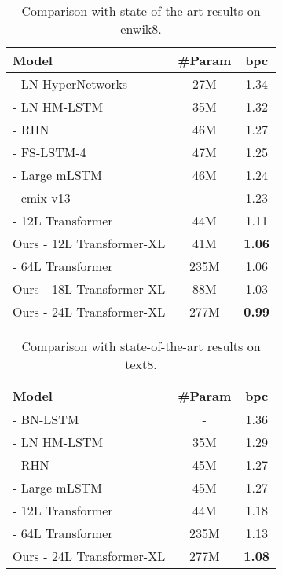 \documentclass[11pt,a4paper]{article}
\begin{document}
\bgroup
\setlength{\tabcolsep}{3pt}
\begin{table}[t]
    \small
    \centering
    \begin{tabular}{l|cc}
        \toprule
        \bf Model & \bf \#Param & \bf bpc \\
        \midrule
        \citet{ha2016hypernetworks} - LN HyperNetworks & 27M & 1.34 \\
        \citet{chung2016hierarchical} - LN HM-LSTM & 35M & 1.32 \\
        \citet{zilly2016recurrent} - RHN & 46M & 1.27 \\
        \citet{mujika2017fast} - FS-LSTM-4 & 47M & 1.25 \\
        \citet{krause2016multiplicative} - Large mLSTM & 46M & 1.24 \\
        \citet{cmix} - cmix v13 & - & 1.23 \\
        \citet{al2018character} - 12L Transformer & 44M & 1.11 \\
Ours - 12L Transformer-XL & 41M & \textbf{1.06} \\
        \midrule
        \citet{al2018character} - 64L Transformer & 235M & 1.06 \\
        Ours - 18L Transformer-XL & 88M & 1.03 \\
        Ours - 24L Transformer-XL & 277M & \textbf{0.99} \\
        \bottomrule
    \end{tabular}
    \caption{\small
        Comparison with state-of-the-art results on enwik8.
    }
    \label{table:enwik8}
\end{table}
\egroup

\bgroup
\setlength{\tabcolsep}{3pt}
\begin{table}[t]
    \small
    \centering
    \begin{tabular}{l|cc}
        \toprule
        \bf Model & \bf \#Param & \bf bpc \\
        \midrule
        \citet{cooijmans2016recurrent} - BN-LSTM & - & 1.36 \\
        \citet{chung2016hierarchical} - LN HM-LSTM & 35M & 1.29 \\
        \citet{zilly2016recurrent} - RHN & 45M & 1.27 \\
        \citet{krause2016multiplicative} - Large mLSTM & 45M & 1.27 \\
        \citet{al2018character} - 12L Transformer & 44M & 1.18 \\
        \midrule
        \citet{al2018character} - 64L Transformer & 235M & 1.13 \\
        Ours - 24L Transformer-XL & 277M & \textbf{1.08} \\
        \bottomrule
    \end{tabular}
    \caption{\small
        Comparison with state-of-the-art results on text8.
    }
    \label{table:text8}
\end{table}
\egroup
\end{document}
